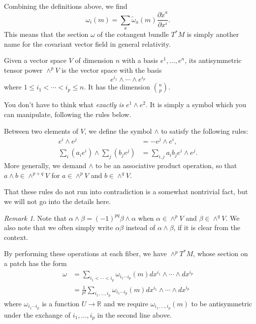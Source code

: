 \documentclass[12pt]{article}
\numberwithin{equation}{section}
\numberwithin{figure}{section}
\theoremstyle{remark}
\newtheorem{remark}[definition]{Remark}
\def\bR{\mathbb{R}}
\begin{document}
Combining the definitions above, we find \begin{equation}
\omega_i(m)=\sum_a \tilde\omega_a(m) \frac{\partial \tilde x^a}{\partial x^i}.
\end{equation}
This means that the section $\omega$ of the cotangent bundle $T^*M$ is simply another name for the covariant vector field in general relativity.

\begin{definition}
  Given a vector space $V$ of dimension $n$ with a basis $e^1,\ldots,e^n$, 
  its antisymmetric tensor power $\wedge^p V$ is the vector space with the basis \begin{equation}
    e^{i_1}\wedge \cdots \wedge e^{i_p}
  \end{equation} where $1\le i_1<\cdots<i_p\le n$.
  It has the dimension $\binom{n}{p}$.
\end{definition}

You don't have to think what \emph{exactly is} $e^1\wedge e^2$.
It is simply a symbol which you can manipulate, following the rules below.
\begin{definition}
Between two elements of $V$,
we define the symbol $\wedge$ to satisfy the following rules:
\begin{align}
  e^i\wedge e^j &= - e^j\wedge e^i,\\
  \sum_i (a_i e^i) \wedge \sum_j (b_j e^j) &= \sum_{i,j} a_i b_j e^i\wedge e^j.
\end{align}
More generally, we demand $\wedge$ to be an associative product operation,
so that $a\wedge b\in \wedge^{p+q} V$ for $a\in \wedge^p V$ and $b\in \wedge^q V$.
\end{definition}
That these rules do not run into contradiction is a somewhat nontrivial fact,
but we will not go into the details here.
\begin{remark}
  Note that $\alpha\wedge \beta=(-1)^{pq}\beta\wedge \alpha$ when  $\alpha\in \wedge^p V$ and $\beta\in \wedge^q V$.
We also note that we often simply write $\alpha\beta$ instead of $\alpha\wedge \beta$, if it is clear from the context.  
\end{remark}


By performing these operations at each fiber, we have $\wedge^p T^*M$,
whose section on a patch has the form \begin{align}
  \omega   &=
  \sum_{i_1<\cdots<i_p} \omega_{i_1\cdots i_p}(m) dx^{i_1}\wedge \cdots \wedge dx^{i_p} \\
  &= 
  \frac{1}{p!} \sum_{i_1,\ldots,i_p} \omega_{i_1\cdots i_p}(m) dx^{i_1}\wedge \cdots \wedge dx^{i_p} 
\end{align}
where $\omega_{i_1\cdots i_p}$ is a function $U\to \bR$ 
and we require
$\omega_{i_1,\ldots,i_p}(m)$ to be antisymmetric under the exchange of $i_1,\ldots,i_p$
in the second line above.
\end{document}
